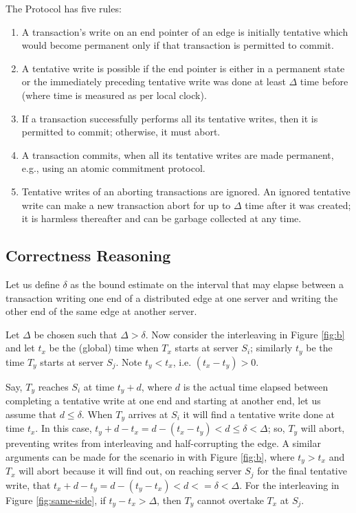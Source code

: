 The \tDelta Protocol has five rules:
\begin{enumerate}
\item A transaction's write on an end pointer of an edge is initially tentative which would become permanent only if that transaction is permitted to commit.
\item A tentative write is possible if the end pointer is either in a permanent state or the immediately preceding tentative write was done at least $\Delta$ time before (where time is measured as per local clock).
\item If a transaction successfully performs all its tentative writes, then it is permitted to commit; otherwise, it must abort.
\item A transaction commits, when all its tentative writes are made permanent, e.g., using an atomic commitment protocol.
\item Tentative writes of an aborting transactions are ignored. An ignored tentative write can make a new transaction abort for up to $\Delta$ time after it was created; it is harmless thereafter and can be garbage collected at any time.
\end{enumerate}

\subsection{Correctness Reasoning}
\label{sec:corr-reas}

Let us define $\delta$ as the bound estimate on the interval that may elapse between a transaction writing one end of a distributed edge at one server and writing the other end of the same edge at another server.

Let $\Delta$ be chosen such that $\Delta > \delta$.
Now consider the interleaving in Figure \ref{fig:b} and let $t_x$ be the (global) time when $T_x$ starts at server $S_i$; similarly $t_y$ be the time $T_y$ starts at server $S_j$.
Note $t_y < t_x$, i.e. $(t_x - t_y) > 0$.

Say, $T_y$ reaches $S_i$ at time $t_y + d$, where $d$ is the actual time elapsed between completing a tentative write at one end and starting at another end, let us assume that $d \leq \delta$.
When $T_y$ arrives at $S_i$ it will find a tentative write done at time $t_x$.
In this case, $t_y + d - t_x = d - (t_x-t_y) < d \leq \delta < \Delta$; so, $T_y$ will abort, preventing writes from interleaving and half-corrupting the edge.
A similar arguments can be made for the scenario in with Figure \ref{fig:b}, where $t_y > t_x$ and $T_x$ will abort because it will find out, on reaching server $S_j$ for the final tentative write, that $t_x +d - t_y = d - (t_y-t_x) < d <= \delta < \Delta$.
For the interleaving in Figure \ref{fig:same-side}, if $t_y - t_x > \Delta$, then $T_y$ cannot overtake $T_x$ at $S_j$.

